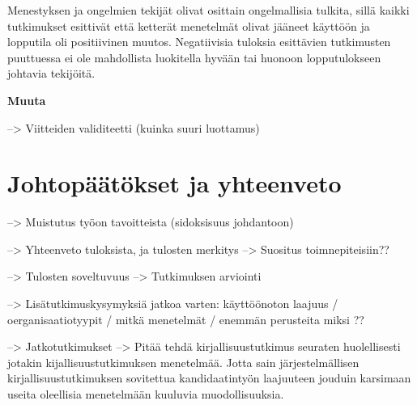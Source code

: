 Menestyksen ja ongelmien tekijät olivat osittain ongelmallisia tulkita, sillä
kaikki tutkimukset esittivät että ketterät menetelmät olivat jääneet käyttöön ja
lopputila oli positiivinen muutos. Negatiivisia tuloksia esittävien tutkimusten
puuttuessa ei ole mahdollista luokitella hyvään tai huonoon lopputulokseen
johtavia tekijöitä.


\vspace{1cm}
\textbf{Muuta}

--> Viitteiden validiteetti (kuinka suuri luottamus)


\section{Johtopäätökset ja yhteenveto}
\label{sec:johtopaatokset}

--> Muistutus työon tavoitteista (sidoksisuus johdantoon)

--> Yhteenveto tuloksista, ja tulosten merkitys
--> Suositus toimnepiteisiin??

--> Tulosten soveltuvuus
--> Tutkimuksen arviointi

--> Lisätutkimuskysymyksiä jatkoa varten: käyttöönoton laajuus /
oerganisaatiotyypit / mitkä menetelmät / enemmän perusteita miksi ?? 

--> Jatkotutkimukset
--> Pitää tehdä kirjallisuustutkimus seuraten huolellisesti jotakin
kijallisuustutkimuksen menetelmää. Jotta sain järjestelmällisen
kirjallisuustutkimuksen sovitettua kandidaatintyön laajuuteen jouduin
karsimaan useita oleellisia menetelmään kuuluvia muodollisuuksia.



